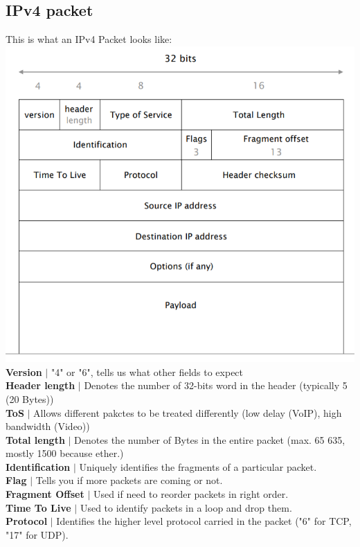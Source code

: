 \documentclass[a4paper, fontsize=8pt, landscape, DIV=1]{scrartcl}
\begin{document}
\begin{multicols*}{4}
   		\subsection{IPv4 packet}
   		This is what an IPv4 Packet looks like:
   		\includegraphics[width=\columnwidth]{images/Network_Layer/IPv4_packet.png}
   		\textbf{Version} $\vert$  "4" or "6", tells us what other fields to expect\\ 
   		\textbf{Header length} $\vert$ Denotes the number of 32-bits word in the header (typically 5 (20 Bytes)) \\ 
   		\textbf{ToS} $\vert$ Allows different pakctes to be treated differently (low delay (VoIP), high bandwidth (Video))\\
   		\textbf{Total length} $\vert$ Denotes the number of Bytes in the entire packet (max. 65 635, mostly 1500 because ether.)\\
   		\textbf{Identification} $\vert$ Uniquely identifies the fragments of a particular packet.\\
   		\textbf{Flag} $\vert$ Tells you if more packets are coming or not.\\
   		\textbf{Fragment Offset} $\vert$ Used if need to reorder packets in right order.\\
   		\textbf{Time To Live} $\vert$ Used to identify packets in a loop and drop them.\\
   		\textbf{Protocol} $\vert$ Identifies the higher level protocol carried in the packet ("6" for TCP, "17" for UDP).\\

\end{multicols*}
\end{document}
